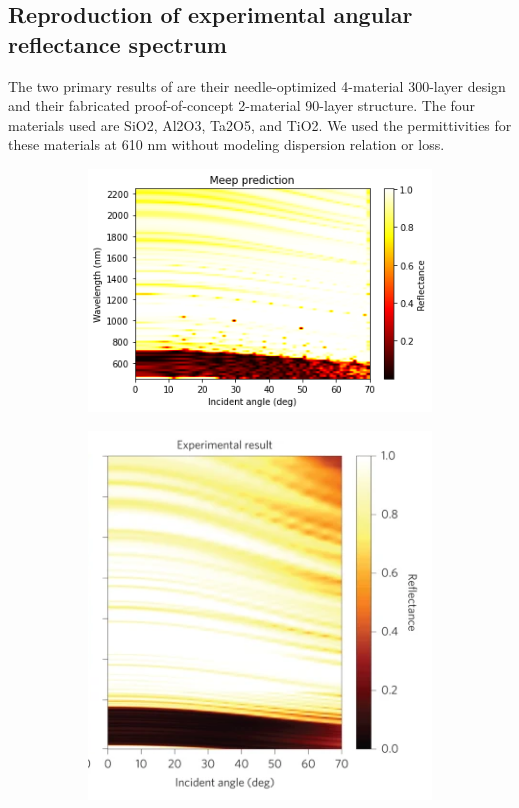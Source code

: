 \documentclass[%
 reprint,
 amsmath,amssymb,
 aps
]{revtex4-2}
\begin{document}
\subsection{Reproduction of experimental angular reflectance spectrum}
The two primary results of \cite{ilic} are their needle-optimized 4-material 300-layer design and their fabricated proof-of-concept 2-material 90-layer structure. The four materials used are SiO2, Al2O3, Ta2O5, and TiO2. We used the permittivities for these materials at 610 nm without modeling dispersion relation or loss. 
\begin{figure}
\centering
\begin{subfigure}{.3\textwidth}
  \centering
  \includegraphics[width=1.\linewidth]{meep_fig_3_colorbar.PNG}
  \label{fig:sub1}
\end{subfigure}%
\begin{subfigure}{.3\textwidth}
  \centering
  \includegraphics[width=.85\linewidth]{actual_fig_3.PNG}

\end{subfigure}
\end{figure}
\end{document}
